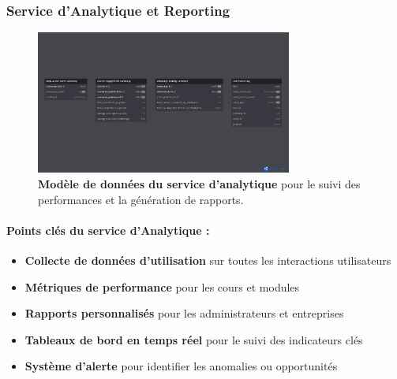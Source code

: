\subsubsection{Service d'Analytique et Reporting}
\begin{figure}[H]
  \centering
  \includegraphics[width=0.75\textwidth,keepaspectratio]{week_1_img/services_db_screanshots/Screenshot 2025-06-06 at 15-04-59 Analytics_and_Reporting_Service.pdf.png}
  \caption{\textbf{Modèle de données du service d'analytique} pour le suivi des performances et la génération de rapports.}
  \label{fig:analytics_service}
\end{figure}

\small
\paragraph{Points clés du service d'Analytique :}
\begin{itemize}[leftmargin=*,noitemsep,topsep=0pt]
  \item \textbf{Collecte de données d'utilisation} sur toutes les interactions utilisateurs
  \item \textbf{Métriques de performance} pour les cours et modules
  \item \textbf{Rapports personnalisés} pour les administrateurs et entreprises
  \item \textbf{Tableaux de bord en temps réel} pour le suivi des indicateurs clés
  \item \textbf{Système d'alerte} pour identifier les anomalies ou opportunités
\end{itemize}
\normalsize


